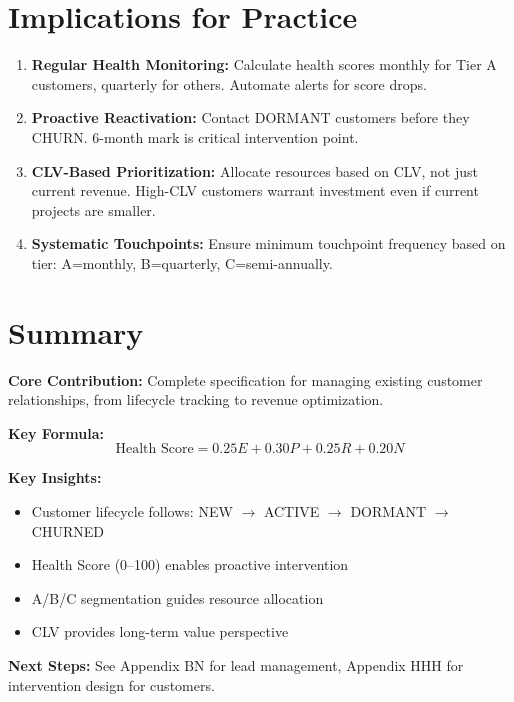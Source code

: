 \section{Implications for Practice}
\label{sec:bp-practice}

\begin{tcolorbox}[colback=green!5!white, colframe=green!75!black,
    title=Practical Implications]
\begin{enumerate}
\item \textbf{Regular Health Monitoring:} Calculate health scores monthly for
      Tier A customers, quarterly for others. Automate alerts for score drops.
\item \textbf{Proactive Reactivation:} Contact DORMANT customers before they
      CHURN. 6-month mark is critical intervention point.
\item \textbf{CLV-Based Prioritization:} Allocate resources based on CLV, not
      just current revenue. High-CLV customers warrant investment even if
      current projects are smaller.
\item \textbf{Systematic Touchpoints:} Ensure minimum touchpoint frequency
      based on tier: A=monthly, B=quarterly, C=semi-annually.
\end{enumerate}
\end{tcolorbox}


\section{Summary}
\label{sec:bp-summary}

\begin{tcolorbox}[colback=gray!5!white, colframe=gray!75!black,
    title=Appendix BP Summary: Customer Management System]

\textbf{Core Contribution:}
Complete specification for managing existing customer relationships, from
lifecycle tracking to revenue optimization.

\textbf{Key Formula:}
\begin{equation}
\text{Health Score} = 0.25E + 0.30P + 0.25R + 0.20N
\end{equation}

\textbf{Key Insights:}
\begin{itemize}[nosep]
\item Customer lifecycle follows: NEW $\rightarrow$ ACTIVE $\rightarrow$ DORMANT $\rightarrow$ CHURNED
\item Health Score (0--100) enables proactive intervention
\item A/B/C segmentation guides resource allocation
\item CLV provides long-term value perspective
\end{itemize}

\textbf{Next Steps:} See Appendix BN for lead management, Appendix HHH for
intervention design for customers.
\end{tcolorbox}


